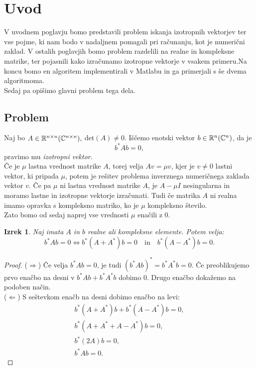 \documentclass[12pt,a4paper]{amsart}\usepackage[slovene]{babel}%
\theoremstyle{definition}\newtheorem{definicija}{Definicija}[section]\newtheorem{primer}[definicija]{Primer}\newtheorem{opomba}[definicija]{Opomba}
\theoremstyle{plain}\newtheorem{lema}[definicija]{Lema}\newtheorem{izrek}[definicija]{Izrek}\newtheorem{trditev}[definicija]{Trditev}\newtheorem{posledica}[definicija]{Posledica}
\begin{document}
{\section{Uvod}V uvodnem poglavju bomo predstavili problem iskanja izotropnih vektorjev ter vse pojme, ki nam bodo v nadaljnem pomagali pri računanju, kot je numerični zaklad. V ostalih poglavjih bomo problem razdelili na realne in kompleksne matrike, ter pojasnili kako izračunamo izotropne vektorje v vsakem primeru.Na koncu bomo en algoritem implementirali v Matlabu in ga primerjali s še dvema algoritmoma.\\Sedaj pa opišimo glavni problem tega dela.\subsection{Problem}
Naj bo $A\in\mathbb R^{n\times n} (\mathbb C^{n\times n}),$ $\text{det}(A)\ne 0$. Iščemo enotski vektor $b\in\mathbb R^{n} (\mathbb C^{n})$, da je\begin{equation}\label{eq:zac}b^\ast Ab=0,\end{equation}pravimo mu \emph{izotropni vektor}. \\%
Če je $\mu$ lastna vrednost matrike $A$, torej velja $Av=\mu v$, kjer je $v\ne 0$ lastni vektor, ki pripada $\mu$, potem je rešitev problema inverznega numeričnega zaklada vektor $v$. Če pa $\mu$ ni lastna vrednost matrike $A$, je $A-\mu I$ nesingularna in moramo lastne in izotropne vektorje izračunati. Tudi če matrika $A$ ni realna imamo opravka s kompleksno matriko, ko je $\mu$ kompleksno število.\\Zato bomo od sedaj naprej vse vrednosti $\mu$ enačili z $0$.\begin{izrek}\cite{meurant}Naj imata $A$ in $b$ realne ali kompleksne elemente. Potem velja:$$b^\ast Ab=0\Leftrightarrow b^\ast (A+A^\ast)b=0\quad \textrm{in} \quad b^\ast(A-A^\ast)b=0.$$\end{izrek}\begin{proof}($\Rightarrow$) Če velja $b^\ast Ab=0$, je tudi $(b^\ast Ab)^\ast=b^\ast A^\ast b=0$. Če preoblikujemo prvo enačbo na desni v $b^\ast Ab +b^\ast A^\ast b$ dobimo 0. Drugo enačbo dokažemo na podoben način.\\($\Leftarrow$) S seštevkom enačb na desni dobimo enačbo na levi:\begin{align*} b^\ast (A+A^\ast)b+b^\ast(A-A^\ast)b=0,\\b^\ast (A+A^\ast+A-A^\ast)b=0,\\b^\ast (2A)b=0,\\b^\ast Ab=0.\end{align*}\end{proof}
}
\end{document}
